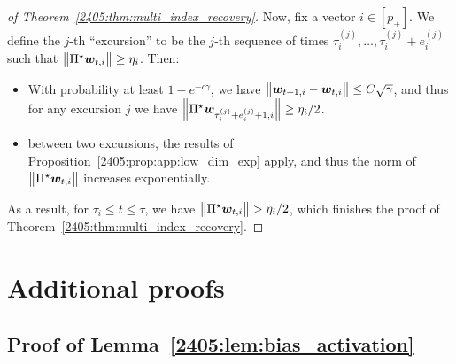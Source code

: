 \begin{proof}[of Theorem~\ref{2405:thm:multi_index_recovery}]
    Now, fix a vector $i \in [p_+]$. We define the $j$-th ``excursion'' to be the $j$-th sequence of times $\tau_i^{(j)}, \dots, \tau_i^{(j)} + e_i^{(j)}$ such that $\left\lVert \Pi^\star{\boldsymbol{w}}_{t, i}\right\rVert \geq \eta_i$. Then:
    \begin{itemize}
        \item  With probability at least $1 - e^{-c\gamma}$, we have $\left\lVert {\boldsymbol{w}}_{t+1, i} - {\boldsymbol{w}}_{t, i}\right\rVert \leq C \sqrt{\gamma}$, and thus for any excursion $j$ we have $\left\lVert \Pi^\star{\boldsymbol{w}}_{\tau_i^{(j)} + e_i^{(j)} +1, i}\right\rVert \geq \eta_i/2$.
        \item between two excursions, the results of Proposition~\ref{2405:prop:app:low_dim_exp} apply, and thus the norm of $\left\lVert \Pi^\star {\boldsymbol{w}}_{t, i}\right\rVert$ increases exponentially.
    \end{itemize}
   As a result, for $\tau_i \leq t \leq \tau$, we have $\left\lVert \Pi^\star {\boldsymbol{w}}_{t, i}\right\rVert > \eta_i / 2$, which finishes the proof of Theorem~\ref{2405:thm:multi_index_recovery}.
\end{proof}

\section{Additional proofs}

\subsection{Proof of Lemma~\ref{2405:lem:bias_activation}}


